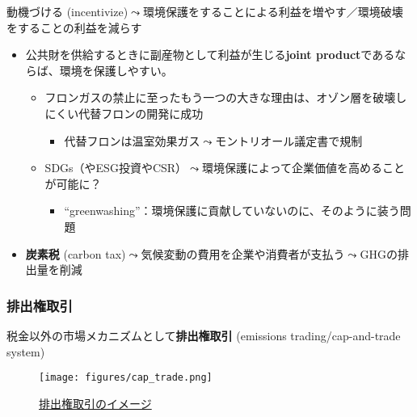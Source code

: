 \documentclass[
  xelatex,
  ja=standard]{bxjsarticle}
\providecommand{\tightlist}{%
  \setlength{\itemsep}{0pt}\setlength{\parskip}{0pt}}\usepackage{longtable,booktabs,array}
\begin{document}
動機づける
(incentivize)\(\leadsto\)環境保護をすることによる利益を増やす／環境破壊をすることの利益を減らす

\begin{itemize}
\tightlist
\item
  公共財を供給するときに副産物として利益が生じる\textbf{joint
  product}であるならば、環境を保護しやすい。

  \begin{itemize}
  \tightlist
  \item
    フロンガスの禁止に至ったもう一つの大きな理由は、オゾン層を破壊しにくい代替フロンの開発に成功

    \begin{itemize}
    \tightlist
    \item
      代替フロンは温室効果ガス\(\leadsto\)モントリオール議定書で規制
    \end{itemize}
  \item
    SDGs（やESG投資やCSR）\(\leadsto\)環境保護によって企業価値を高めることが可能に？

    \begin{itemize}
    \tightlist
    \item
      ``greenwashing''：環境保護に貢献していないのに、そのように装う問題
    \end{itemize}
  \end{itemize}
\item
  \textbf{炭素税} (carbon
  tax)\(\leadsto\)気候変動の費用を企業や消費者が支払う\(\leadsto\)GHGの排出量を削減
\end{itemize}

\hypertarget{ux6392ux51faux6a29ux53d6ux5f15}{%
\subsubsection{排出権取引}\label{ux6392ux51faux6a29ux53d6ux5f15}}

税金以外の市場メカニズムとして\textbf{排出権取引} (emissions
trading/cap-and-trade system)

\begin{figure}[htpb]

{\centering \texttt{[image: figures/cap\_trade.png]}

}

\caption{\href{https://ieei.or.jp/2016/09/special201608008/?type=print}{排出権取引のイメージ}}

\end{figure}
\end{document}

